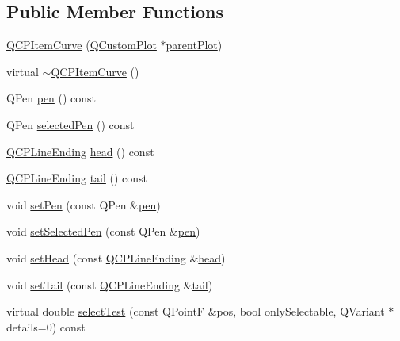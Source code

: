 \subsection*{Public Member Functions}
\begin{DoxyCompactItemize}
\item 
\hyperlink{class_q_c_p_item_curve_ac9b7508bb5c8827e1a7a6199f8c82bec}{Q\+C\+P\+Item\+Curve} (\hyperlink{class_q_custom_plot}{Q\+Custom\+Plot} $\ast$\hyperlink{class_q_c_p_layerable_ab7e0e94461566093d36ffc0f5312b109}{parent\+Plot})
\item 
virtual \hyperlink{class_q_c_p_item_curve_ae36f20fd5deff2f1443a7c53eaa95c81}{$\sim$\+Q\+C\+P\+Item\+Curve} ()
\item 
Q\+Pen \hyperlink{class_q_c_p_item_curve_abc6321e55a9ba1a0c7df407843dfa252}{pen} () const 
\item 
Q\+Pen \hyperlink{class_q_c_p_item_curve_abd8b8be5b13bc4dafec4c1758c281336}{selected\+Pen} () const 
\item 
\hyperlink{class_q_c_p_line_ending}{Q\+C\+P\+Line\+Ending} \hyperlink{class_q_c_p_item_curve_afc067f0d1e60cd04812f2c2c7fdf36c3}{head} () const 
\item 
\hyperlink{class_q_c_p_line_ending}{Q\+C\+P\+Line\+Ending} \hyperlink{class_q_c_p_item_curve_a9adddfcc5275be0cf27e3c0c31c37c1a}{tail} () const 
\item 
void \hyperlink{class_q_c_p_item_curve_a034be908440aec785c34b92843461221}{set\+Pen} (const Q\+Pen \&\hyperlink{class_q_c_p_item_curve_abc6321e55a9ba1a0c7df407843dfa252}{pen})
\item 
void \hyperlink{class_q_c_p_item_curve_a375b917669f868c5a106bf2f1ab7c26d}{set\+Selected\+Pen} (const Q\+Pen \&\hyperlink{class_q_c_p_item_curve_abc6321e55a9ba1a0c7df407843dfa252}{pen})
\item 
void \hyperlink{class_q_c_p_item_curve_a08a30d9cdd63995deea3d9e20430676f}{set\+Head} (const \hyperlink{class_q_c_p_line_ending}{Q\+C\+P\+Line\+Ending} \&\hyperlink{class_q_c_p_item_curve_afc067f0d1e60cd04812f2c2c7fdf36c3}{head})
\item 
void \hyperlink{class_q_c_p_item_curve_ac3488d8b1a6489c845dc5bff3ef71124}{set\+Tail} (const \hyperlink{class_q_c_p_line_ending}{Q\+C\+P\+Line\+Ending} \&\hyperlink{class_q_c_p_item_curve_a9adddfcc5275be0cf27e3c0c31c37c1a}{tail})
\item 
virtual double \hyperlink{class_q_c_p_item_curve_a741375c11667b5f9c95b2683f93ee514}{select\+Test} (const Q\+Point\+F \&pos, bool only\+Selectable, Q\+Variant $\ast$details=0) const 
\end{DoxyCompactItemize}
